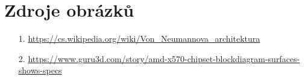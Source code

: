 \documentclass[a4paper]{article}
\begin{document}
\section{Zdroje obrázků}
    \begin{itemize}
        \item[1.] \url{https://cs.wikipedia.org/wiki/Von_Neumannova_architektura}
        \item[2.] \url{https://www.guru3d.com/story/amd-x570-chipset-blockdiagram-surfaces-shows-specs} 
    \end{itemize}
\end{document}
